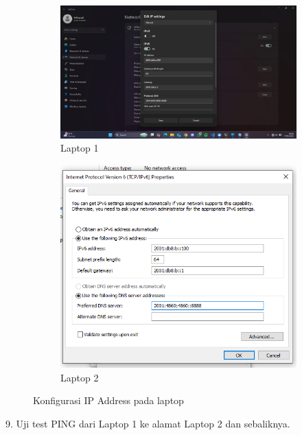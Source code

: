 \begin{figure}[H]
    \centering
    \begin{subfigure}[b]{0.3\linewidth}
      \centering
      \includegraphics[width=\linewidth]{image/statis8.jpg}
      \caption{Laptop 1}
    \end{subfigure}
    \hspace{1cm}
    \begin{subfigure}[b]{0.3\linewidth}
      \centering
      \includegraphics[width=\linewidth]{image/statis7.png}
      \caption{Laptop 2}
    \end{subfigure}
    \caption{Konfigurasi IP Address pada laptop}
\end{figure}
9.  Uji test PING dari Laptop 1 ke alamat Laptop 2 dan sebaliknya. 
